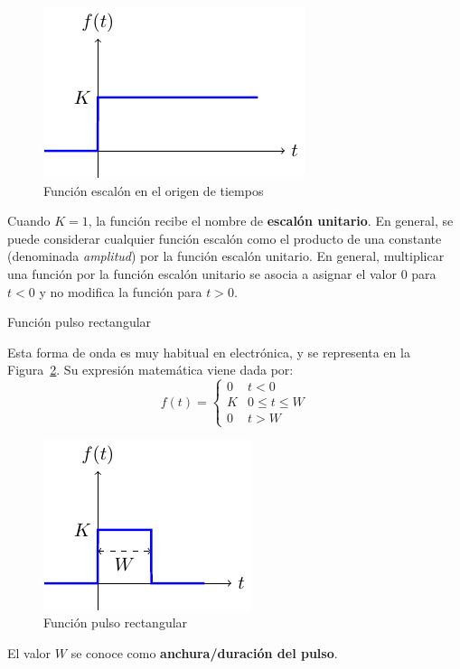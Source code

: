 \documentclass[11pt]{book} %
\makeatletter
\numberwithin{dummy}{section}
\theoremstyle{ocrenumbox}
\theoremstyle{blacknumex}
\theoremstyle{blacknumbox}
\theoremstyle{ocrenum}
\renewcommand{\subsubsection}{\@startsection {subsubsection}{3}{\z@}
{-2ex \@plus -0.1ex \@minus -.2ex}
{.2ex \@plus.2ex }
{\normalfont\small\sffamily\bfseries}}
\makeatother
\begin{document}
	\begin{figure}[htbp]
		\centering
		\includegraphics[width=.35\linewidth]{../figs/escalon.pdf}
		\caption{Función escalón en el origen de tiempos}
		\label{fig.escalon}
	\end{figure}
	
	Cuando $K = 1$, la función recibe el nombre de \textbf{escalón unitario}. En general, se puede considerar cualquier función escalón como el producto de una constante (denominada \textit{amplitud}) por la función escalón unitario.
	En general, multiplicar una función por la función escalón unitario se asocia a asignar el valor 0 para $t<0$ y no modifica la función para $t>0$.
	
	\subsubsection{Función pulso rectangular}
	
	Esta forma de onda es muy habitual en electrónica, y se representa en la Figura~\ref{fig.pulso}. Su expresión matemática viene dada por:
	\begin{equation}
		\boxed{f(t) = %
			\begin{cases}
				0 & t < 0\\
				K & 0 \leq t \leq W\\
				0 & t>W
		\end{cases}}
	\end{equation}
	\begin{figure}[htbp]
		\centering
		\includegraphics[width=.35\linewidth]{../figs/pulso.pdf}
		\caption{Función pulso rectangular}
		\label{fig.pulso}
	\end{figure}
	
	El valor $W$ se conoce como \textbf{anchura/duración del pulso}. 
	
\end{document}
